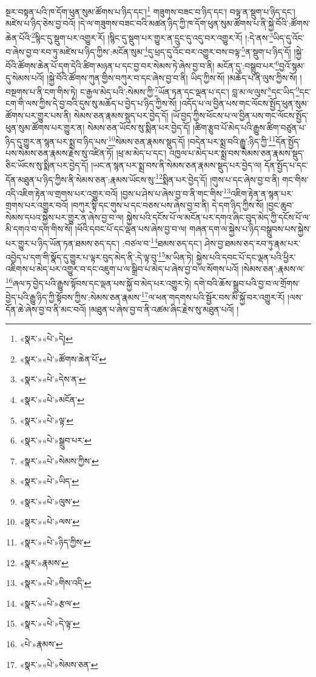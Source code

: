 སྔར་བསྟན་པའི་ཁ་དོག་ཕུན་སུམ་ཚོགས་པ་ཉིད་དང་།\footnote{«སྣར་»«པེ་»དེ།} གཟུགས་བཟང་བ་ཉིད་དང་། བལྟ་ན་སྡུག་པ་ཉིད་དང་། མཛེས་པ་ཉིད་ཅེས་བྱ་བའོ། །དེ་ལ་གཟུགས་བཟང་བའི་མཚན་ཉིད་ཀྱི་ཁ་དོག་ཕུན་སུམ་ཚོགས་པ་ནི་སྐྱེ་བོའི་:ཚོགས་ཆེན་པོའི་\footnote{«སྣར་»«པེ་»ཚོགས་ཆེན་པོ་}སྙིང་དུ་སྡུག་པར་འགྱུར་རོ། །སྙིང་དུ་སྡུག་པར་གྱུར་ན་དྲུང་དུ་འདུ་བར་འགྱུར་རོ། །:དེ་ནས་\footnote{«སྣར་»«པེ་»དེས་ན་}ཡིད་དུ་འོང་བ་ཞེས་བྱ་བ་རབ་ཏུ་མཛེས་པ་ཉིད་ཀྱིས་:མངོན་སུམ་\footnote{«སྣར་»«པེ་»མངོན་}དུ་ཕྲད་དུ་འོང་བར་འགྱུར་བས་བལྟ་\footnote{«སྣར་»«པེ་»ལྟ་}ན་སྡུག་པ་ཉིད་དོ། །སྐྱེ་བོའི་ཚོགས་ཆེན་པོ་དག་དེའི་ཚིག་མཉན་པ་དང་བྱ་བར་སེམས་ཏེ་ཞེས་བྱ་བ་ནི། མངོན་དུ་:བསྒྲུབ་པར་\footnote{«སྣར་»«པེ་»སྒྲུབ་པར་}བྱའོ་སྙམ་དུ་སེམས་པའོ། །སྐྱེ་བོའི་ཚོགས་ཀུན་གྱིས་བཀུར་བ་དང་ཞེས་བྱ་བ་ནི། ཡིད་ཀྱིས་སོ། །མཆོད་པ་ནི་ལུས་ཀྱིས་སོ། །བསྔགས་པ་ནི་ངག་གིས་ཏེ། ང་རྒྱལ་མེད་པའི་:སེམས་ཀྱི་\footnote{«སྣར་»«པེ་»སེམས་ཀྱིས་}ཡོན་ཏན་དང་ལྡན་པ་དང་། བླ་མ་ལ་ལུས་\footnote{«སྣར་»«པེ་»ཡིད་}དང་ཡིད་\footnote{«སྣར་»«པེ་»ལུས་}དང་ངག་གི་ལས་ཀྱིས་དེ་བྱ་བའི་དུས་སུ་མཆོད་པ་བྱེད་པ་ཉིད་ཀྱིས་སོ། །འདོད་པ་ལ་བྱིན་པས་གང་ལོངས་སྤྱོད་ཕུན་སུམ་ཚོགས་པར་གྱུར་པས་ནི། སེམས་ཅན་རྣམས་སྡུད་པར་བྱེད་དོ། །ཡོ་བྱད་ཀྱིས་ཕོངས་པ་ལ་བྱིན་པས་གང་ལོངས་སྤྱོད་ཕུན་སུམ་ཚོགས་པར་གྱུར་ན། སེམས་ཅན་ཡོངས་སུ་སྨིན་པར་བྱེད་དོ། །ཚིག་རྩུབ་པོ་མེད་པའི་རྒྱུས་ཚིག་བཙུན་པ་ཉིད་དུ་གྱུར་ན་སྙན་པར་སྨྲ་བ་ཉིད་པས་\footnote{«སྣར་»«པེ་»ལས་}སེམས་ཅན་རྣམས་སྡུད་དོ། །བདེན་པར་སྨྲ་བའི་རྒྱུ་:ཉིད་ཀྱི་\footnote{«སྣར་»«པེ་»ཉིད་ཀྱིས་}དོན་སྤྱོད་པས་སེམས་ཅན་རྣམས་རྗེས་སུ་འཛིན་ཏོ། །ཕྲ་མ་མེད་པ་དང་། འཁྱལ་པ་མེད་པར་སྨྲ་བས་སེམས་ཅན་རྣམས་སྡུད་ཅིང་ཡོངས་སུ་སྨིན་པར་བྱེད་དོ། །ཡང་ན་སྙན་པར་སྨྲ་བས་ནི་སེམས་ཅན་རྣམས་སྡུད་པར་བྱེད་ལ། དོན་སྤྱོད་པ་དང་དོན་མཐུན་པ་ཉིད་ཀྱིས་ནི་སེམས་ཅན་:རྣམས་ཡོངས་སུ་\footnote{«སྣར་»རྣམས་}སྨིན་པར་བྱེད་དོ། །གུས་པ་དང་ཞེས་བྱ་བ་ནི། གང་གིས་འདི་འཇིག་རྟེན་ལ་གྲགས་པར་འགྱུར་བའོ། །བྱས་པ་ཤེས་པ་ཞེས་བྱ་བ་ནི་གང་གིས་\footnote{«སྣར་»«པེ་»གིས་འདི་}འཇིག་རྟེན་ན་སྙན་པར་གྲགས་པར་འགྱུར་བའོ། །བཀུར་སྟི་དང་གུས་པ་དང་བཅས་པས་ཞེས་བྱ་བ་ནི། དེ་དག་ཉིད་ཀྱིས་སོ། །བྱང་ཆུབ་སེམས་དཔའ་སྐྱེས་པར་གྱུར་ན་ཞེས་བྱ་བ་ལ། སྐྱེས་པའི་དངོས་པོ་ལ་མངོན་པར་དགའ་ཞིང་བུད་མེད་ཀྱི་དངོས་པོ་ལ་མི་དགའ་བ་དག་གིས་སོ། །ཕོའི་དབང་པོ་དང་ལྡན་པས་ཞེས་བྱ་བ་ལ། གཞན་དག་ལ་སྐྱེས་པ་ཉིད་བསྒྲུབས་པས་སྐྱེས་པར་གྱུར་པ་ཉིད་ཡོན་ཏན་ཐམས་ཅད་དང་། :བཙལ་བ་\footnote{«སྣར་»«པེ་»རྩལ་}ཐམས་ཅད་དང་། ཤེས་བྱ་ཐམས་ཅད་རབ་ཏུ་རྣམ་པར་འབྱེད་པ་དག་གི་སྣོད་དུ་གྱུར་པ་ལྟར་བུད་མེད་ནི་:དེ་ལྟ་བུ་\footnote{«སྣར་»«པེ་»དེ་ལྟ་}མ་ཡིན་ཏེ། སྐྱེས་པའི་དབང་པོ་དང་ལྡན་པའི་ཕྱིར་འཇིགས་པ་མེད་པར་འགྱུར་བ་དང་འཇུག་པ་ལ་སྒྲིབ་པ་མེད་པ་ཞེས་བྱ་བ་ལ་སོགས་པའོ། །སེམས་ཅན་:རྣམས་ལ་\footnote{«པེ་»རྣམས་}ཞལ་ཏ་བྱེད་པའི་རྒྱུས་སྟོབས་དང་ལྡན་པས་སྐྱོ་བ་མེད་པར་འགྱུར་ཏེ། དགེ་བའི་ཆོས་སྒྲུབ་པའི་བྱ་བ་ལ་གྲོགས་བྱེད་པའི་རྒྱུ་ཉིད་ཀྱི་སྟོབས་ཀྱིས་:སེམས་ཅན་རྣམས་\footnote{«སྣར་»«པེ་»སེམས་ཅན་}ལ་ཕན་གདགས་པའི་སྦྱོར་བས་མི་སྐྱོ་བར་འགྱུར་རོ། །ལས་དོན་ཆེ་ཞེས་བྱ་བ་ནི་མང་བའོ། །མཐུན་པ་ཞེས་བྱ་བ་ནི་འཚམ་ཞིང་རྗེས་སུ་མཐུན་པའོ། །
